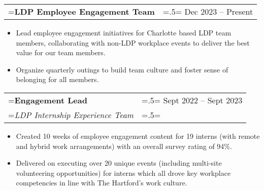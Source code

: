 \documentclass{article}
\begin{document}
\hspace{-1em}
\begin{tabularx}{\textwidth}{
    >{\raggedright\arraybackslash\hsize=1.5\hsize\linewidth=\hsize}X
    >{\raggedleft\arraybackslash\hsize=.5\hsize\linewidth=\hsize}X }
    \textbf{LDP Employee Engagement Team} & Dec 2023 -- Present\\
\end{tabularx}
\vspace{-.5em}
\begin{itemize}[label={--}, leftmargin=1em]
    \setlength\itemsep{0em}
    \item Lead employee engagement initiatives for Charlotte based LDP team members, collaborating with non-LDP workplace events to deliver the best value for our team members.
    \item Organize quarterly outings to build team culture and foster sense of belonging for all members.
\end{itemize}

\hspace{-1em}
\begin{tabularx}{\textwidth}{
    >{\raggedright\arraybackslash\hsize=1.5\hsize\linewidth=\hsize}X
    >{\raggedleft\arraybackslash\hsize=.5\hsize\linewidth=\hsize}X }
    \textbf{Engagement Lead} & Sept 2022 -- Sept 2023\\
    \textit{LDP Internship Experience Team} & \\
\end{tabularx}
\vspace{-.5em}
\begin{itemize}[label={--}, leftmargin=1em]
    \setlength\itemsep{0em}
    \item Created 10 weeks of employee engagement content for 19 interns (with remote and hybrid work arrangements) with an overall survey rating of 94\%.
    \item Delivered on executing over 20 unique events (including multi-site volunteering opportunities) for interns which all drove key workplace competencies in line with The Hartford's work culture.
\end{itemize}

\end{document}
